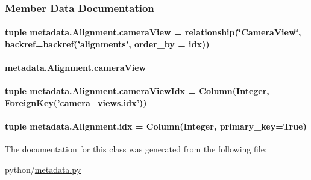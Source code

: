 \subsubsection{Member Data Documentation}
\hypertarget{classmetadata_1_1Alignment_a598b4395f5de4eb2ba5fb4fa4f3949da}{
\paragraph[{camera\-View}]{\setlength{\rightskip}{0pt plus 5cm}tuple metadata.\-Alignment.\-camera\-View = relationship(\char`\"{}Camera\-View\char`\"{}, backref=backref('alignments', order\-\_\-by = {\bf idx}))\hspace{0.3cm}{\ttfamily [static]}}}\label{classmetadata_1_1Alignment_a598b4395f5de4eb2ba5fb4fa4f3949da}
\hypertarget{classmetadata_1_1Alignment_a9e23763abf24ef8b40b62776f0d088fd}{
\paragraph[{camera\-View}]{\setlength{\rightskip}{0pt plus 5cm}metadata.\-Alignment.\-camera\-View}}\label{classmetadata_1_1Alignment_a9e23763abf24ef8b40b62776f0d088fd}
\hypertarget{classmetadata_1_1Alignment_aad17a6114e7cd9602aa7cd297cd7465e}{
\paragraph[{camera\-View\-Idx}]{\setlength{\rightskip}{0pt plus 5cm}tuple metadata.\-Alignment.\-camera\-View\-Idx = Column(Integer, Foreign\-Key('camera\-\_\-views.\-idx'))\hspace{0.3cm}{\ttfamily [static]}}}\label{classmetadata_1_1Alignment_aad17a6114e7cd9602aa7cd297cd7465e}
\hypertarget{classmetadata_1_1Alignment_aefc5837250a62d76466899e8720044b5}{
\paragraph[{idx}]{\setlength{\rightskip}{0pt plus 5cm}tuple metadata.\-Alignment.\-idx = Column(Integer, primary\-\_\-key=True)\hspace{0.3cm}{\ttfamily [static]}}}\label{classmetadata_1_1Alignment_aefc5837250a62d76466899e8720044b5}


The documentation for this class was generated from the following file\-:\begin{DoxyCompactItemize}
\item 
python/\hyperlink{metadata_8py}{metadata.\-py}\end{DoxyCompactItemize}
